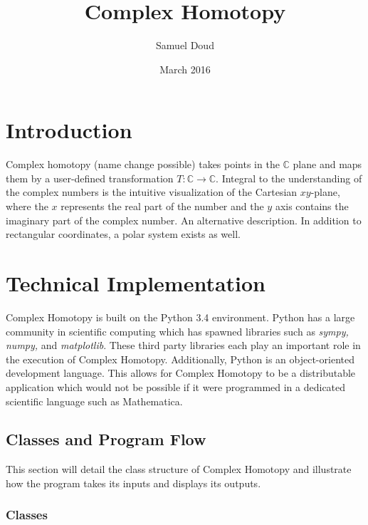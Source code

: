 \documentclass{article}
\title{Complex Homotopy}
\author{Samuel Doud}
\date{March 2016}
\begin{document}
\maketitle

\section{Introduction}
Complex homotopy (name change possible) takes points in the $\mathbb{C}$ plane and maps them by a user-defined transformation $T:\mathbb{C} \rightarrow \mathbb{C}$.
Integral to the understanding of the complex numbers is the intuitive visualization of the Cartesian $xy$-plane, where the $x$ represents the real part of the number and the $y$ axis contains the imaginary part of the complex number. An alternative description. In addition to rectangular coordinates, a polar system exists as well.

\section{Technical Implementation}
Complex Homotopy is built on the Python 3.4 environment. Python has a large community in scientific computing which has spawned libraries such as \textit{sympy, numpy,} and \textit{matplotlib}. These third party libraries each play an important role in the execution of Complex Homotopy. Additionally, Python is an object-oriented development language. This allows for Complex Homotopy to be a distributable application which would not be possible if it were programmed in a dedicated scientific language such as Mathematica.

    \subsection{Classes and Program Flow}
    This section will detail the class structure of Complex Homotopy and illustrate how the program takes its inputs and displays its outputs.
        \subsubsection{Classes}
\end{document}
